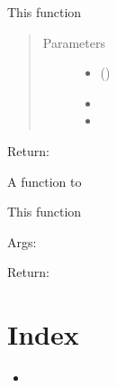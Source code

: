 \documentclass[letterpaper,10pt,english,openany,oneside]{sphinxmanual}
\begin{document}
\begin{fulllineitems}
\begin{fulllineitems}
This function
\begin{quote}\begin{description}
\item[{Parameters}] \leavevmode\begin{itemize}
\item {} 
\sphinxstyleliteralstrong{\sphinxupquote{(}}\sphinxstyleliteralstrong{\sphinxupquote{)}} () \textendash{} 

\item {} 
\sphinxstyleliteralstrong{\sphinxupquote{(}}\sphinxstyleliteralstrong{\sphinxupquote{)}} \textendash{} 

\item {} 
\sphinxstyleliteralstrong{\sphinxupquote{(}}\sphinxstyleliteralstrong{\sphinxupquote{)}} \textendash{} 

\end{itemize}

\end{description}\end{quote}

Return:

\end{fulllineitems}


\begin{fulllineitems}
\label{\detokenize{nloed:nloed.design.Design.__sort_inputs}}
A function to

This function

Args:

Return:

\end{fulllineitems}


\end{fulllineitems}



\chapter{Index}
\label{\detokenize{index:index}}\begin{itemize}
\item {} 

\end{itemize}
\end{document}
